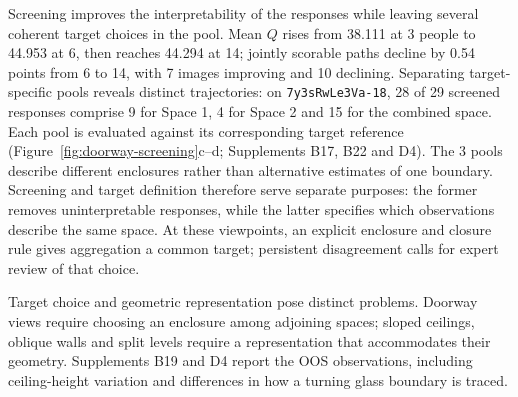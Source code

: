 

Screening improves the interpretability of the responses while leaving several coherent target choices in the pool. Mean $Q$ rises from 38.111 at 3 people to 44.953 at 6, then reaches 44.294 at 14; jointly scorable paths decline by 0.54 points from 6 to 14, with 7 images improving and 10 declining. Separating target-specific pools reveals distinct trajectories: on \texttt{7y3sRwLe3Va-18}, 28 of 29 screened responses comprise 9 for Space 1, 4 for Space 2 and 15 for the combined space. Each pool is evaluated against its corresponding target reference (Figure~\ref{fig:doorway-screening}c--d; Supplements B17, B22 and D4). The 3 pools describe different enclosures rather than alternative estimates of one boundary. Screening and target definition therefore serve separate purposes: the former removes uninterpretable responses, while the latter specifies which observations describe the same space. At these viewpoints, an explicit enclosure and closure rule gives aggregation a common target; persistent disagreement calls for expert review of that choice.

Target choice and geometric representation pose distinct problems. Doorway views require choosing an enclosure among adjoining spaces; sloped ceilings, oblique walls and split levels require a representation that accommodates their geometry. Supplements B19 and D4 report the OOS observations, including ceiling-height variation and differences in how a turning glass boundary is traced.

